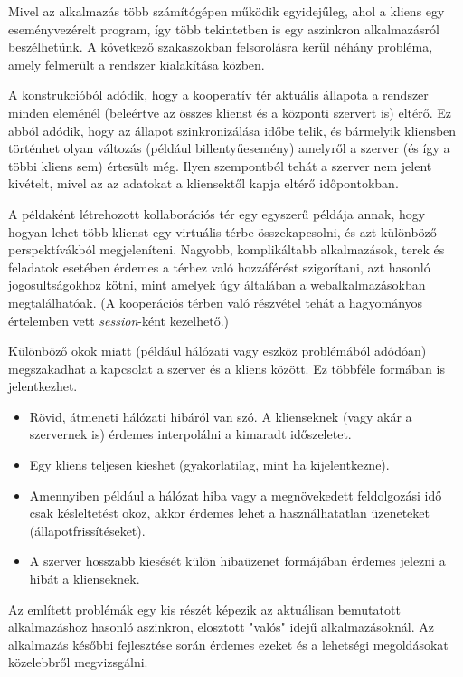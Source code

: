 
Mivel az alkalmazás több számítógépen működik egyidejűleg, ahol a kliens egy eseményvezérelt program, így több tekintetben is egy aszinkron alkalmazásról beszélhetünk.
A következő szakaszokban felsorolásra kerül néhány probléma, amely felmerült a rendszer kialakítása közben.


A konstrukcióból adódik, hogy a kooperatív tér aktuális állapota a rendszer minden eleménél (beleértve az összes klienst és a központi szervert is) eltérő.
Ez abból adódik, hogy az állapot szinkronizálása időbe telik, és bármelyik kliensben történhet olyan változás (például billentyűesemény) amelyről a szerver (és így a többi kliens sem) értesült még.
Ilyen szempontból tehát a szerver nem jelent kivételt, mivel az az adatokat a kliensektől kapja eltérő időpontokban.


A példaként létrehozott kollaborációs tér egy egyszerű példája annak, hogy hogyan lehet több klienst egy virtuális térbe összekapcsolni, és azt különböző perspektívákból megjeleníteni.
Nagyobb, komplikáltabb alkalmazások, terek és feladatok esetében érdemes a térhez való hozzáférést szigorítani, azt hasonló jogosultságokhoz kötni, mint amelyek úgy általában a webalkalmazásokban megtalálhatóak.
(A kooperációs térben való részvétel tehát a hagyományos értelemben vett \textit{session}-ként kezelhető.)


Különböző okok miatt (például hálózati vagy eszköz problémából adódóan) megszakadhat a kapcsolat a szerver és a kliens között.
Ez többféle formában is jelentkezhet.
\begin{itemize}
	\item Rövid, átmeneti hálózati hibáról van szó. A klienseknek (vagy akár a szervernek is) érdemes interpolálni a kimaradt időszeletet.
	\item Egy kliens teljesen kieshet (gyakorlatilag, mint ha kijelentkezne).
	\item Amennyiben például a hálózat hiba vagy a megnövekedett feldolgozási idő csak késleltetést okoz, akkor érdemes lehet a használhatatlan üzeneteket (állapotfrissítéseket).
	\item A szerver hosszabb kiesését külön hibaüzenet formájában érdemes jelezni a hibát a klienseknek.
\end{itemize}

Az említett problémák egy kis részét képezik az aktuálisan bemutatott alkalmazáshoz hasonló aszinkron, elosztott "valós" idejű alkalmazásoknál.
Az alkalmazás későbbi fejlesztése során érdemes ezeket és a lehetségi megoldásokat közelebbről megvizsgálni.
